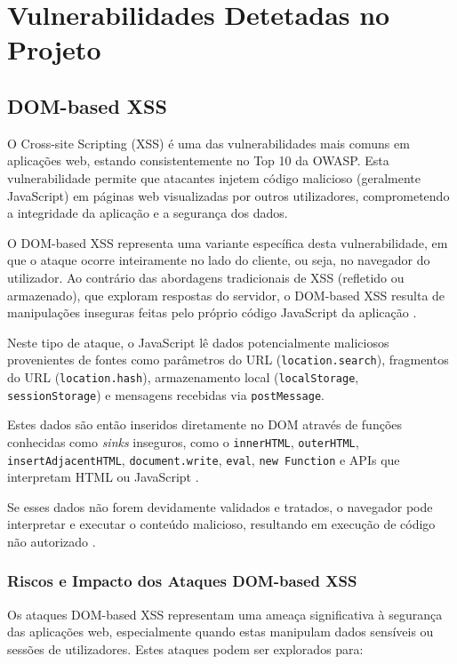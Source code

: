 \section{Vulnerabilidades Detetadas no Projeto}
\label{sec:vulnerabilidades-detetadas}

\subsection{DOM-based XSS}
\label{subsec:dom-based-xss}

O Cross-site Scripting (XSS) é uma das vulnerabilidades mais comuns em aplicações web, estando consistentemente no Top 10 da OWASP. Esta vulnerabilidade permite que atacantes injetem código malicioso (geralmente JavaScript) em páginas web visualizadas por outros utilizadores, comprometendo a integridade da aplicação e a segurança dos dados.

O DOM-based XSS representa uma variante específica desta vulnerabilidade, em que o ataque ocorre inteiramente no lado do cliente, ou seja, no navegador do utilizador. Ao contrário das abordagens tradicionais de XSS (refletido ou armazenado), que exploram respostas do servidor, o DOM-based XSS resulta de manipulações inseguras feitas pelo próprio código JavaScript da aplicação \cite{ref39}.

Neste tipo de ataque, o JavaScript lê dados potencialmente maliciosos provenientes de fontes como parâmetros do URL (\texttt{location.search}), fragmentos do URL (\texttt{location.hash}), armazenamento local (\texttt{localStorage}, \texttt{sessionStorage}) e mensagens recebidas via \texttt{postMessage}.

Estes dados são então inseridos diretamente no DOM através de funções conhecidas como \textit{sinks} inseguros, como o \texttt{innerHTML}, \texttt{outerHTML}, \texttt{insertAdjacentHTML}, \texttt{document.write}, \texttt{eval}, \texttt{new Function} e APIs que interpretam HTML ou JavaScript \cite{ref40}.

Se esses dados não forem devidamente validados e tratados, o navegador pode interpretar e executar o conteúdo malicioso, resultando em execução de código não autorizado \cite{ref38}.

\subsubsection{Riscos e Impacto dos Ataques DOM-based XSS}
\label{subsubsec:riscos-impacto-dom-xss}

Os ataques DOM-based XSS representam uma ameaça significativa à segurança das aplicações web, especialmente quando estas manipulam dados sensíveis ou sessões de utilizadores. Estes ataques podem ser explorados para:

